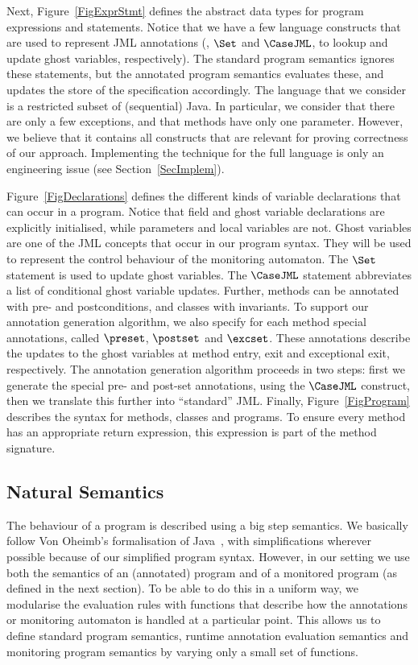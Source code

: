Next, Figure~\ref{FigExprStmt} defines the abstract data types for
program expressions and statements. Notice that we have a few language
constructs that are used to represent JML annotations (\EvalG, \(\Set\) and
\(\CaseJML\), to lookup and update ghost variables, respectively). 
The standard program semantics ignores these statements, but the
annotated program semantics evaluates these, and updates the store of
the specification accordingly. The language that we consider is a
restricted subset of (sequential) Java. In particular, we consider
that there are only a few exceptions, and that methods have
only one parameter. However, we believe that it contains all
constructs that are relevant for proving correctness of our
approach. Implementing the technique for the full language is only an
engineering issue (see Section~\ref{SecImplem}).

Figure~\ref{FigDeclarations} defines the different kinds of variable
declarations that can occur in a program. Notice that field and ghost
variable declarations are explicitly initialised, while parameters and
local variables are not. Ghost variables are one of the JML concepts
that occur in our program syntax. They will be used to represent the
control behaviour of the monitoring automaton. The \(\Set\) statement
is used to update ghost variables. The \(\CaseJML\) statement
abbreviates a list of conditional ghost variable updates.  Further,
methods can be annotated with pre- and postconditions, and classes
with invariants. To support our annotation generation algorithm, we
also specify for each method special annotations, called
\(\preset\),
\(\postset\) and \(\excset\). These annotations describe the updates
to the ghost variables at method entry, exit and exceptional exit,
respectively. The annotation generation algorithm proceeds in two
steps: first we generate the special pre- and post-set annotations,
using the \(\CaseJML\) construct, then we translate this further into
``standard'' JML. Finally, Figure~\ref{FigProgram} describes the
syntax for methods, classes and programs. To ensure every method has
an appropriate return expression, this expression is part of the
method signature.

\subsection{Natural Semantics}\label{SecSemantics}
The behaviour of a program is described using a big step semantics. We
basically follow Von Oheimb's formalisation of Java~\cite{vOheimb?},
with simplifications wherever possible because of our simplified
program syntax. However, in our setting we use both the semantics of
an (annotated) program and of a monitored program (as defined in the
next section). To be able to do this in a uniform way, we modularise
the evaluation rules with functions that describe how the annotations
or monitoring automaton is handled at a particular point. This allows
us to define standard program semantics, runtime annotation evaluation
semantics and monitoring program semantics by varying only a small set
of functions.


